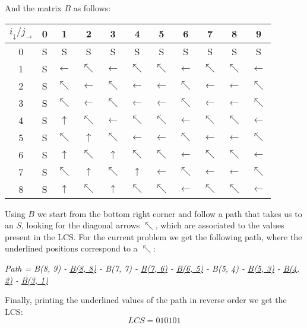 \documentclass{article}
\begin{document}
\begin{enumerate}[1.]
    And the matrix $B$ as follows:
	\begin{table}[ht]
		\centering
		\begin{tabular}{c|cccccccccc}
			\toprule
			$i_{\downarrow} / j_{\rightarrow}$ & 0 & 1 & 2 & 3 & 4 & 5 & 6 & 7 & 8 & 9 \\
			\midrule
			0 & S & S & S & S & S & S & S & S & S & S \\
			1 & S & $\leftarrow$ & $\nwarrow$ & $\leftarrow$ & $\nwarrow$ & $\nwarrow$ & $\leftarrow$ & $\nwarrow$ & $\nwarrow$ & $\leftarrow$ \\
			2 & S & $\nwarrow$ & $\leftarrow$ & $\nwarrow$ & $\leftarrow$ & $\leftarrow$ & $\nwarrow$ & $\leftarrow$ & $\leftarrow$ & $\nwarrow$ \\
			3 & S & $\nwarrow$ & $\leftarrow$ & $\nwarrow$ & $\leftarrow$ & $\leftarrow$ & $\nwarrow$ & $\leftarrow$ & $\leftarrow$ & $\nwarrow$ \\
			4 & S & $\uparrow$ & $\nwarrow$ & $\leftarrow$ & $\nwarrow$ & $\nwarrow$ & $\leftarrow$ & $\nwarrow$ & $\nwarrow$ & $\leftarrow$ \\
			5 & S & $\nwarrow$ & $\uparrow$ & $\nwarrow$ & $\leftarrow$ & $\leftarrow$ & $\nwarrow$ & $\leftarrow$ & $\leftarrow$ & $\nwarrow$ \\
			6 & S & $\uparrow$ & $\nwarrow$ & $\uparrow$ & $\nwarrow$ & $\nwarrow$ & $\leftarrow$ & $\nwarrow$ & $\nwarrow$ & $\leftarrow$ \\
			7 & S & $\nwarrow$ & $\uparrow$ & $\nwarrow$ & $\uparrow$ & $\leftarrow$ & $\nwarrow$ & $\leftarrow$ & $\leftarrow$ & $\nwarrow$ \\
			8 & S & $\uparrow$ & $\nwarrow$ & $\uparrow$ & $\nwarrow$ & $\nwarrow$ & $\leftarrow$ & $\nwarrow$ & $\nwarrow$ & $\leftarrow$ \\
			\bottomrule
		\end{tabular}
	\end{table}
    
   Using $B$ we start from the bottom right corner and follow a path that takes us to an $S$, looking for the diagonal arrows $\nwarrow$, which are associated to the values present in the LCS. For the current problem we get the following path, where the underlined positions correspond to a $\nwarrow$:
    \begin{center}
        \emph{Path = B(8, 9) - \underline{B(8, 8)} - B(7, 7) - \underline{B(7, 6)} - \underline{B(6, 5)} - B(5, 4) - \underline{B(5, 3)} - \underline{B(4, 2)} - \underline{B(3, 1)}}\\
    \end{center}
    \vspace{0.25cm}
    Finally, printing the underlined values of the path in reverse order we get the LCS:
    \begin{equation*}
        \textit{LCS} = 010101
    \end{equation*}
    

\end{enumerate}
\end{document}

